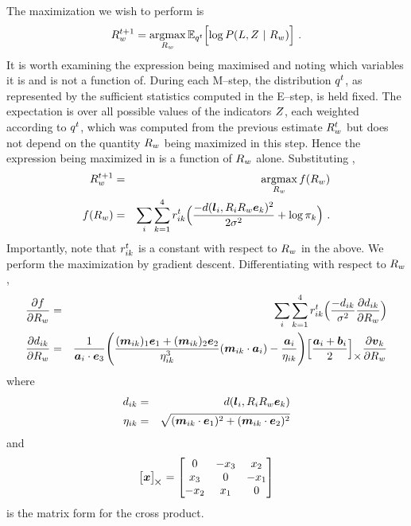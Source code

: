 The maximization we wish to perform is
\begin{equation}
  \label{eq:R-argmax}
  \SceneR^{t+1} = \argmax_{\SceneR}\limits
  \Expected_{\PosteriorEst^t}\Bigl[
    \log P(\LineSegs,\Indicators ~|~ \SceneR) 
  \Bigr] ~.
\end{equation}
It is worth examining the expression being maximised and noting which
variables it is and is not a function of. During each M--step, the
distribution $\PosteriorEst^t$, as represented by the sufficient
statistics computed in the E--step, is held fixed. The expectation is
over all possible values of the indicators $\Indicators$, each
weighted according to $\PosteriorEst^t$, which was computed from the
previous estimate $\SceneR^t$ but does not depend on the quantity
$\SceneR$ being maximized in this step. Hence the expression being
maximized in  is a function of $\SceneR$ alone. Substituting
,
\begin{eqnarray}
  \SceneR^{t+1} &=& \argmax_{\SceneR}\limits \ErrorFunc(\SceneR) \\
  \ErrorFunc(\SceneR) 
  &=&
  \label{eq:R-error}
  \sum_i \sum_{k=1}^4
  \Resp_{ik}^t
  \Bigl(
    \frac{-\dist(\LineSeg_i, \CamR_i\SceneR\ebasis_k)^2}{2\sigma^2}
    + \log \Mixing_k
  \Bigr)~.
\end{eqnarray}
Importantly, note that $\Resp_{ik}^t$ is a constant with respect to
$\SceneR$ in the above. We perform the maximization
 by gradient descent. Differentiating
 with respect to $\SceneR$,
\begin{eqnarray}
  \Deriv{\ErrorFunc}{\SceneR}
  &=&
  \sum_i \sum_{k=1}^4
  \Resp_{ik}^t
  \Bigl(
    \frac{-\dist_{ik}}{\sigma^2}
    \Deriv{\dist_{ik}}{\SceneR} 
  \Bigr)\\
  \Deriv{\dist_{ik}}{\SceneR} &=&
  \frac{1}{\StartPt_i \cdot \ez} 
  \Biggl(
    \frac
      {(\ReprojLine_{ik})_1\ex + (\ReprojLine_{ik})_2\ey}
      {\eta_{ik}^3}
    (\ReprojLine_{ik} \cdot \StartPt_i)
    -
    \frac{\StartPt_i}{\eta_{ik}}
  \Biggr)
  \Bigl[ \frac{\StartPt_i+\EndPt_i}{2} \Bigr]_{\cross}
  \Deriv{\vpt_k}{\SceneR}
\end{eqnarray} 
where
\begin{eqnarray}
  \dist_{ik} &=& \dist(\LineSeg_i, \CamR_i\SceneR\ebasis_k)\\
  \eta_{ik} &=&
   \sqrt{(\ReprojLine_{ik} \cdot \ex)^2 +
         (\ReprojLine_{ik} \cdot \ey)^2}
\end{eqnarray}
and
\begin{equation}
  \bigl[ \vect{x} \bigr]_{\!\cross} = 
  \begin{bmatrix}
    0 & -x_3 & x_2 \\
    x_3 & 0 & -x_1 \\
    -x_2 & x_1 & 0
  \end{bmatrix}
\end{equation}
is the matrix form for the cross product.

